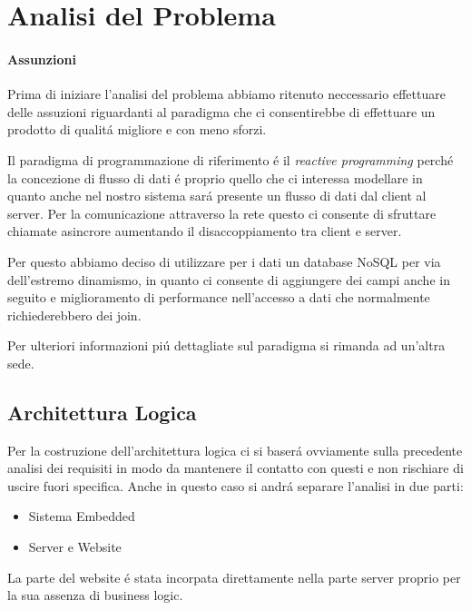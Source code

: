 \section{Analisi del Problema}

\paragraph{Assunzioni}
Prima di iniziare l'analisi del problema abbiamo ritenuto neccessario effettuare delle assuzioni riguardanti al paradigma che ci consentirebbe di effettuare un prodotto di qualit\'a migliore e con meno sforzi.

Il paradigma di programmazione di riferimento \'e il \textit{reactive programming} perch\'e la concezione di flusso di dati \'e proprio quello che ci interessa modellare in quanto anche nel nostro sistema sar\'a presente un flusso di dati dal client al server. Per la comunicazione attraverso la rete questo ci consente di sfruttare chiamate asincrore aumentando il disaccoppiamento tra client e server.

Per questo abbiamo deciso di utilizzare per i dati un database NoSQL per via dell'estremo dinamismo, in quanto ci consente di aggiungere dei campi anche in seguito e miglioramento di performance nell'accesso a dati che normalmente richiederebbero dei join.

Per ulteriori informazioni pi\'u dettagliate sul paradigma si rimanda ad un'altra sede. 

\subsection{Architettura Logica}

Per la costruzione dell'architettura logica ci si baser\'a ovviamente sulla precedente analisi dei requisiti in modo da mantenere il contatto con questi e non rischiare di uscire fuori specifica. Anche in questo caso si andr\'a separare l'analisi in due parti:

\begin{itemize}
\item Sistema Embedded
\item Server e Website
\end{itemize}

La parte del website \'e stata incorpata direttamente nella parte server proprio per la sua assenza di business logic.

